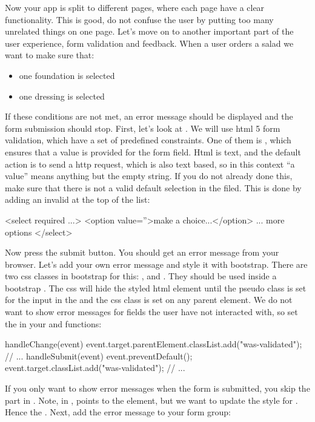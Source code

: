 \documentclass[fleqn, article, a4paper]{memoir}
\begin{document}
\begin{Assignments}
\item Now your app is split to different pages, where each page have a clear functionality. This is good, do not confuse the user by putting too many unrelated things on one page. Let's move on to another important part of the user experience, form validation and feedback. When a user orders a salad we want to make sure that:
\begin{itemize}
  \item one foundation is selected
  \item one dressing is selected
\end{itemize}
If these conditions are not met, an error message should be displayed and the form submission should stop.
First, let's look at . We will use html 5 form validation, which have a set of predefined constraints. One of them is , which ensures that a value is provided for the form field. Html is text, and the default action is to send a http request, which is also text based, so in this context ``a value'' means anything but the empty string. If you do not already done this, make sure that there is not a valid default selection in the  filed. This is done by adding an invalid  at the top of the list:
\begin{Code}
<select required ...>
  <option value=''>make a choice...</option>
  ... more options
</select>
\end{Code}
Now press the submit button. You should get an error message from your browser. Let's add your own error message and style it with bootstrap. There are two css classes in bootstrap for this: , and . They should be used inside a bootstrap . The css will hide the styled html element until the pseudo class  is set for the input in the  and the css class  is set on any parent element. We do not want to show error messages for fields the user have not interacted with, so set the  in your  and  functions:
\begin{Code}
handleChange(event) {
  event.target.parentElement.classList.add("was-validated");
  // ...
}
handleSubmit(event){
  event.preventDefault();
  event.target.classList.add("was-validated");
  // ...
}
\end{Code}
If you only want to show error messages when the form is submitted, you skip the part in . Note, in ,  points to the  element, but we want to update the style for . Hence the . Next, add the error message to your  form group:

\end{Assignments}
\end{document}
